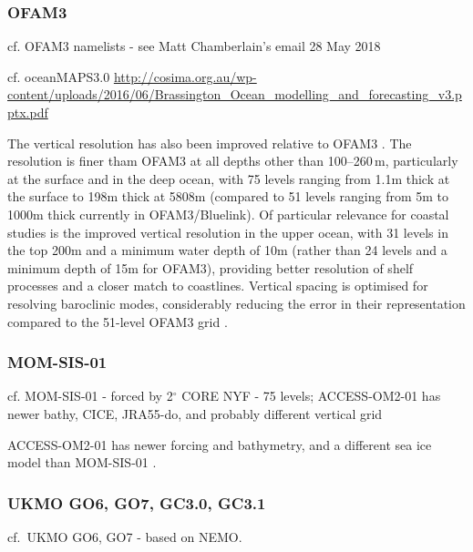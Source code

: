 \documentclass[11pt]{article}
\begin{document}
\subsubsection{OFAM3}
cf. OFAM3 namelists - see Matt Chamberlain's email 28 May 2018

cf. oceanMAPS3.0  \url{http://cosima.org.au/wp-content/uploads/2016/06/Brassington_Ocean_modelling_and_forecasting_v3.pptx.pdf} %

The vertical resolution has also been improved relative to OFAM3 \citep{OkeETAL2013a}. 
The resolution is finer tham OFAM3 at all depths other than 100--260\,m, particularly at the surface and in the deep ocean, with 75 levels ranging from 1.1m thick at the surface to 198m thick at 5808m (compared to 51 levels ranging from 5m to 1000m thick currently in OFAM3/Bluelink). 
Of particular relevance for coastal studies is the improved vertical resolution in the upper ocean, with 31 levels in the top 200m and a minimum water depth of 10m (rather than 24 levels and a minimum depth of 15m for OFAM3), providing better resolution of shelf processes and a closer match to coastlines. 
Vertical spacing is optimised for resolving baroclinic modes, considerably reducing the error in their representation compared to the 51-level OFAM3 grid \citep[][ table~1]{StewartHoggGriffiesHeerdegenWardSpenceEngland2017a}.

\citet{FengZhangOkeMonselesanChamberlainMatearSchiller2016a}

\subsubsection{MOM-SIS-01}
cf. MOM-SIS-01 \citet{SpenceHolmesHoggGriffiesStewartEngland2017a} - forced by 2$^\circ$ CORE NYF - 75 levels; ACCESS-OM2-01 has newer bathy, CICE, JRA55-do, and probably different vertical grid

ACCESS-OM2-01 has newer forcing and bathymetry, and a different sea ice model than MOM-SIS-01 \cite{SpenceHolmesHoggGriffiesStewartEngland2017a}.

\subsubsection{UKMO GO6, GO7, GC3.0, GC3.1}
cf.\ UKMO GO6, GO7 \citet{StorkeyBlakerMathiotMegannAksenovBlockleyCalvertGrahamHewitt2018a} - based on NEMO.
\end{document}
